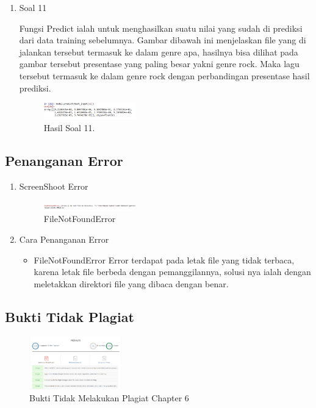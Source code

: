 \begin{enumerate}
	\item Soal 11
	\hfill\break
	
	Fungsi Predict ialah untuk menghasilkan suatu nilai yang sudah di prediksi dari data training sebelumnya. Gambar dibawah ini menjelaskan file yang di jalankan tersebut termasuk ke dalam genre apa, hasilnya bisa dilihat pada gambar tersebut presentase yang paling besar yakni genre rock. Maka lagu tersebut termasuk ke dalam genre rock dengan perbandingan presentase hasil prediksi.
	\begin{figure}[H]
	\centering
		\includegraphics[width=4cm]{figures/1174077/6/20.png}
		\caption{Hasil Soal 11.}
	\end{figure}
\end{enumerate}

\subsection{Penanganan Error}
\begin{enumerate}
	\item ScreenShoot Error
	\begin{figure}[H]
		\includegraphics[width=4cm]{figures/1174077/6/error.png}
		\centering
		\caption{FileNotFoundError}
	\end{figure}

	\item Cara Penanganan Error
	\begin{itemize}
		\item FileNotFoundError
		\hfill\break
		Error terdapat pada letak file yang tidak terbaca, karena letak file berbeda dengan pemanggilannya, solusi nya ialah dengan meletakkan direktori file yang dibaca dengan benar.
	\end{itemize}
\end{enumerate}

\subsection{Bukti Tidak Plagiat}
\begin{figure}[H]
\centering
	\includegraphics[width=4cm]{figures/1174077/6/plagiat.png}
	\caption{Bukti Tidak Melakukan Plagiat Chapter 6}
\end{figure}